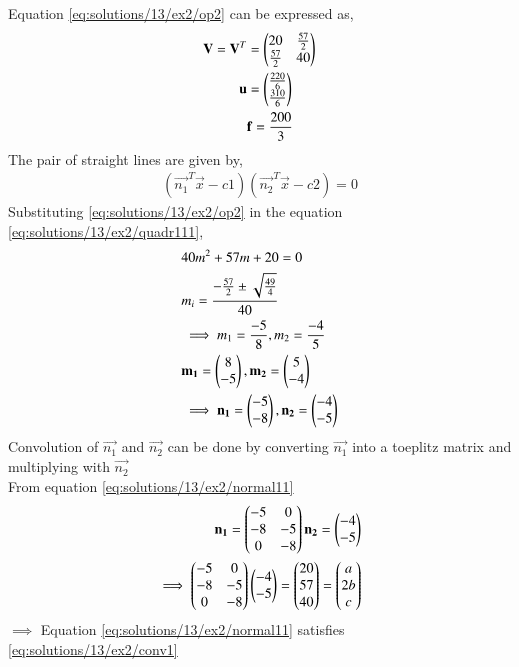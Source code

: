 Equation \eqref{eq:solutions/13/ex2/op2} can be expressed as,
\begin{align}
\mathbf{V}=\mathbf{V}^T&=\begin{pmatrix}20 & \frac{57}{2} \\ \frac{57}{2} & 40\end{pmatrix} \label{eq:solutions/13/ex2/eq1vec1}\\
\mathbf{u}&=\begin{pmatrix}\frac{220}{6} \\ \frac{310}{6}\end{pmatrix} \label{eq:solutions/13/ex2/eq2vec1}\\
&\mathbf{f}=\frac{200}{3}
\end{align}
The pair of straight lines are given by,
\begin{align}
    (\vec{n_1}^{T}\vec{x} - c1)(\vec{n_2}^{T}\vec{x} - c2)=0\label{eq:solutions/13/ex2/maineq2}
\end{align}
Substituting \eqref{eq:solutions/13/ex2/op2} in the equation \eqref{eq:solutions/13/ex2/quadr111},
\begin{align}
    &40m^2+57m+20=0 \label{eq:solutions/13/ex2/quadr11}\\
    &m_i=\frac{-\frac{57}{2}\pm{\sqrt{\frac{49}{4}}}}{40}\\
    &\implies m_1 = \frac{-5}{8} , m_2 = \frac{-4}{5}\\
    & \mathbf{m_1}=\begin{pmatrix}8\\ -5\end{pmatrix}, \mathbf{m_2}=\begin{pmatrix}5\\ -4\end{pmatrix}\\
    &\implies \mathbf{n_1}=\begin{pmatrix}-5\\ -8\end{pmatrix}, \mathbf{n_2}=\begin{pmatrix}-4\\ -5\end{pmatrix} \label{eq:solutions/13/ex2/normal11}
\end{align}
Convolution of $\vec{n_1}$ and $\vec{n_2}$ can be done by converting $\vec{n_1}$ into a toeplitz matrix and multiplying with $\vec{n_2}$\\
From equation \eqref{eq:solutions/13/ex2/normal11}
\begin{align}
    \mathbf{n_1}=\begin{pmatrix}-5&0\\-8&-5\\0&-8\end{pmatrix}
    \mathbf{n_2}=\begin{pmatrix}-4\\ -5\end{pmatrix}\label{eq:solutions/13/ex2/conv21}\\
\implies \begin{pmatrix}-5&0\\-8&-5\\0&-8\end{pmatrix}\begin{pmatrix}-4\\ -5\end{pmatrix} = \begin{pmatrix}20\\57\\40\end{pmatrix} = \begin{pmatrix}a\\2b\\c\end{pmatrix}\label{eq:solutions/13/ex2/conv31}
\end{align}
$\implies$ Equation \eqref{eq:solutions/13/ex2/normal11} satisfies \eqref{eq:solutions/13/ex2/conv1}\\

